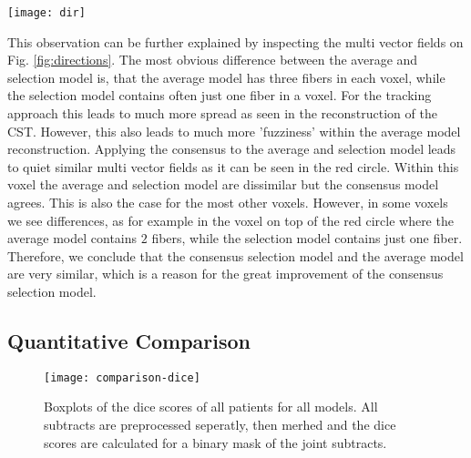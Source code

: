 \begin{figure*}[h]
	\centering
	\texttt{[image: dir]}
	\caption{Reconstructed fiber orientations of the different models, the
	red box in the left image denotes the position within the brain. Top row
shows models without consensus bootstrapping, bottom row with consensus
bootstrapping. Left: Averaging model. Right: selection model.}
	\label{fig:directions}
\end{figure*}

This observation can be further explained by inspecting the multi vector fields
on Fig. \ref{fig:directions}. The most obvious difference between the average and
selection model is, that the average model has three fibers in
each voxel, while the selection model contains often just one fiber in a voxel.
For the tracking approach this leads to much more spread as seen in the
reconstruction of the CST. However, this also leads to much more 'fuzziness'
within the average model reconstruction. 
Applying the consensus to the average
and selection model leads to quiet similar multi vector fields as it can be seen
in the red circle. Within this voxel the average and selection model are
dissimilar but the consensus model agrees. This is also the case for the most
other voxels. However, in some voxels we see differences, as for example in the
voxel on top of the red circle where the average model contains $2$ fibers,
while the selection model contains just one fiber. Therefore, we conclude that
the consensus selection model and the average model are very similar, which is a
reason for the great improvement of the consensus selection model. 

\subsection{Quantitative Comparison}
\begin{figure}[t]
	\centering
	\texttt{[image: comparison-dice]}
	\caption{Boxplots of the dice scores of all patients for all models. All
	subtracts are preprocessed seperatly, then merhed and the dice scores
are calculated for a binary mask of the joint subtracts.}
	\label{fig:Dice}
\end{figure}


